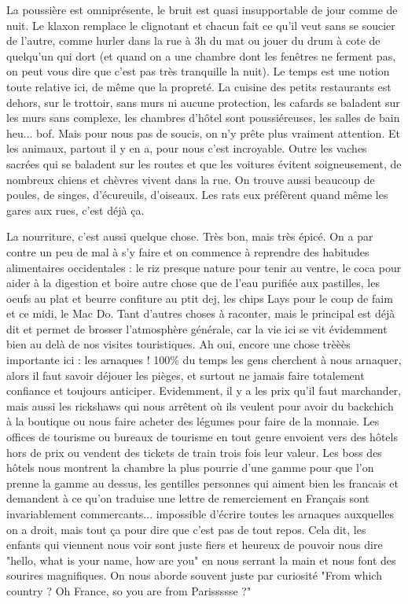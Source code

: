 \begin{multicols}{2}
La poussière est omniprésente, le bruit est quasi insupportable de jour comme de nuit. Le klaxon remplace le clignotant et chacun fait ce qu'il veut sans se soucier de l'autre, comme hurler dans la rue à 3h du mat ou jouer du drum à cote de quelqu'un qui dort (et quand on a une chambre dont les fenêtres ne ferment pas, on peut vous dire que c'est pas très tranquille la nuit). Le temps est une notion toute relative ici, de même que la propreté. La cuisine des petits restaurants est dehors, sur le trottoir, sans murs ni aucune protection, les cafards se baladent sur les murs sans complexe, les chambres d'hôtel sont poussiéreuses, les salles de bain heu... bof. Mais pour nous pas de soucis, on n'y prête plus vraiment attention. Et les animaux, partout il y en a, pour nous c'est incroyable. Outre les vaches sacrées qui se baladent sur les routes et que les voitures évitent soigneusement, de nombreux chiens et chèvres vivent dans la rue. On trouve aussi beaucoup de poules, de singes, d'écureuils, d'oiseaux. Les rats eux préfèrent quand même les gares aux rues, c'est déjà ça.

La nourriture, c'est aussi quelque chose. Très bon, mais très épicé. On a par contre un peu de mal à s'y faire et on commence à reprendre des habitudes alimentaires occidentales : le riz presque nature pour tenir au ventre, le coca pour aider à la digestion et boire autre chose que de l'eau purifiée aux pastilles, les oeufs au plat et beurre confiture au ptit dej, les chips Lays pour le coup de faim et ce midi, le Mac Do. Tant d'autres choses à raconter, mais le principal est déjà dit et permet de brosser l'atmosphère générale, car la vie ici se vit évidemment bien au delà de nos visites touristiques. Ah oui, encore une chose trèèès importante ici : les arnaques ! 100\% du temps les gens cherchent à nous arnaquer, alors il faut savoir déjouer les pièges, et surtout ne jamais faire totalement confiance et toujours anticiper. Evidemment, il y a les prix qu'il faut marchander, mais aussi les rickshaws qui nous arrêtent où ils veulent pour avoir du backchich à la boutique ou nous faire acheter des légumes pour faire de la monnaie. Les offices de tourisme ou bureaux de tourisme en tout genre envoient vers des hôtels hors de prix ou vendent des tickets de train trois fois leur valeur. Les boss des hôtels nous montrent la chambre la plus pourrie d'une gamme pour que l'on prenne la gamme au dessus, les gentilles personnes qui aiment bien les francais et demandent à ce qu'on traduise une lettre de remerciement en Français sont invariablement commercants... impossible d'écrire toutes les arnaques auxquelles on a droit, mais tout ça pour dire que c'est pas de tout repos. Cela dit, les enfants qui viennent nous voir sont juste fiers et heureux de pouvoir nous dire "hello, what is your name, how are you" en nous serrant la main et nous font des sourires magnifiques. On nous aborde souvent juste par curiosité "From which country ? Oh France, so you are from Parissssse ?"


\end{multicols}
